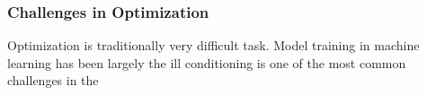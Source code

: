\subsubsection{Challenges in Optimization}

Optimization is traditionally very difficult task. Model training in machine learning has been largely 
the ill conditioning is one of the most common challenges in the 